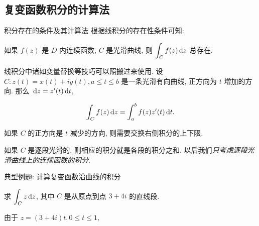 \subsection{复变函数积分的计算法}
\begin{frame}{积分存在的条件及其计算法}
\onslide<+->根据线积分的存在性条件可知:
\onslide<+->
\begin{theorem}
如果 $f(z)$ 是 $D$ 内连续函数, $C$ 是光滑曲线, 则 $\displaystyle\int_Cf(z)\,\mathrm{d} z$ 总存在.
\end{theorem}
\onslide<+->
线积分中诸如变量替换等技巧可以照搬过来使用.
\onslide<+->
设 $C:z(t)=x(t)+iy(t),a\le t\le b$ 是一条光滑有向曲线, 正方向为 $t$ 增加的方向.
\onslide<+->
那么 $\,\mathrm{d} z=z'(t)\,\mathrm{d} t$,
\onslide<+->
\begin{alertblock@}
\[\int_Cf(z)\,\mathrm{d} z=\int_a^b f(z)z'(t)\,\mathrm{d} t.\]
\end{alertblock@}
\onslide<+->
\noindent 如果 $C$ 的正方向是 $t$ 减少的方向, 则需要交换右侧积分的上下限.

\onslide<+->
如果 $C$ 是逐段光滑的, 则相应的积分就是各段的积分之和.
\onslide<+->
以后我们\emph{只考虑逐段光滑曲线上的连续函数的积分}.
\end{frame}


\begin{frame}{典型例题: 计算复变函数沿曲线的积分}
\onslide<+->
\begin{example}
求 $\displaystyle\int_Cz\,\mathrm{d} z$, 其中 $C$ 是从原点到点 $3+4i$ 的直线段.
\end{example}
\onslide<+->
\begin{solution}
由于 $z=(3+4i)t,0\le t\le 1$,
\vspace{-\baselineskip}
\end{solution}
\end{frame}


